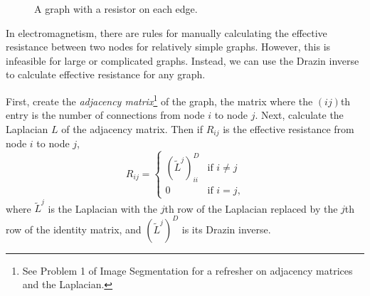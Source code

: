 \begin{center}
\begin{figure}[H]
\caption{A graph with a resistor on each edge.}
\label{fig:resistors}
\end{figure}
\end{center}

In electromagnetism, there are rules for manually calculating the effective resistance between two nodes for relatively simple graphs.
However, this is infeasible for large or complicated graphs.
Instead, we can use the Drazin inverse to calculate effective resistance for any graph.

First, create the \emph{adjacency matrix}\footnote{See Problem 1 of Image Segmentation for a refresher on adjacency matrices and the Laplacian.} of the graph, the matrix where the $(ij)$th entry is the number of connections from node $i$ to node $j$.
Next, calculate the Laplacian $L$ of the adjacency matrix.
Then if $R_{ij}$ is the effective resistance from node $i$ to node $j$,
\begin{equation}
R_{ij} = \begin{cases}
(\widetilde{L}^j)^D_{ii} & \mbox{if $i \neq j$} \\
0 & \mbox{if $i = j$,}
\end{cases}
\label{eq:effective-resistance-with-Drazin}
\end{equation}
where $\widetilde{L}^j$ is the Laplacian with the $j$th row of the Laplacian replaced by the $j$th row of the identity matrix, and $(\widetilde{L}^j)^D$ is its Drazin inverse.

